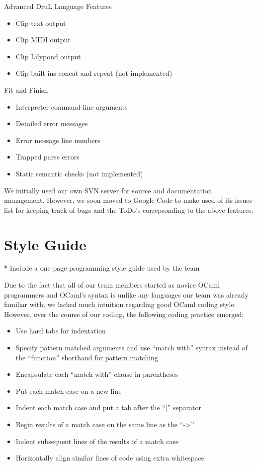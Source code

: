\begin{enumeration}
\item Advanced DruL Language Features
\begin{itemize}
	\item Clip text output
	\item Clip MIDI output
	\item Clip Lilypond output
	\item Clip built-ins concat and repeat (not implemented)
\end{itemize}

\item Fit and Finish
\begin{itemize}
	\item Interpreter command-line arguments
	\item Detailed error messages
	\item Error message line numbers
	\item Trapped parse errors
	\item Static semantic checks (not implemented)
\end{itemize}

\end{enumeration}

We initially used our own SVN server for source and documentation management.  However, we soon moved to Google Code to make used of its issues list for keeping track of bugs and the ToDo's correpsonding to the above features.

\section{Style Guide}
* Include a one-page programming style guide used by the team

Due to the fact that all of our team members started as novice OCaml programmers and OCaml's syntax is unlike any languages our team was already familiar with, we lacked much intuition regarding good OCaml coding style.  However, over the course of our coding, the following coding practice emerged:

\begin{itemize}
	\item Use hard tabs for indentation
	\item Specify pattern matched arguments and use ``match with'' syntax instead of the ``function'' shorthand for pattern matching
	\item Encapsulate each ``match with'' clause in parentheses
	\item Put each match case on a new line
	\item Indent each match case and put a tab after the ``|'' separator
	\item Begin results of a match case on the same line as the ``->''
	\item Indent subsequent lines of the results of a match case
	\item Horizontally align similar lines of code using extra whitespace
\end{itemize}

